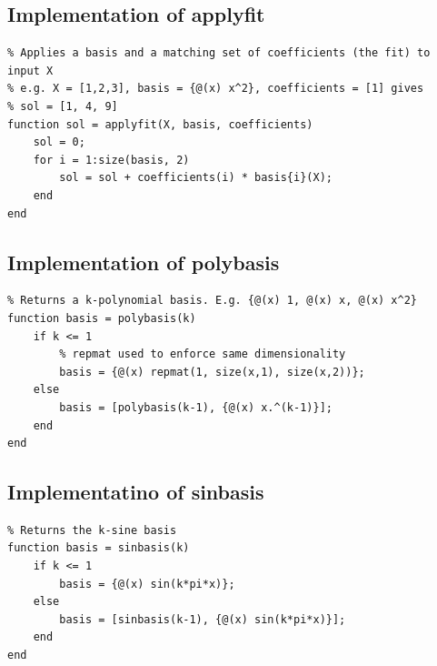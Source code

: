 \documentclass[11pt]{article}
\begin{document}
    \subsection{Implementation of applyfit}
        \begin{lstlisting}
% Applies a basis and a matching set of coefficients (the fit) to input X
% e.g. X = [1,2,3], basis = {@(x) x^2}, coefficients = [1] gives
% sol = [1, 4, 9] 
function sol = applyfit(X, basis, coefficients)
    sol = 0;
    for i = 1:size(basis, 2)
        sol = sol + coefficients(i) * basis{i}(X);
    end
end
        \end{lstlisting}
    
    \subsection{Implementation of polybasis}
        \begin{lstlisting}
% Returns a k-polynomial basis. E.g. {@(x) 1, @(x) x, @(x) x^2}
function basis = polybasis(k)
    if k <= 1
        % repmat used to enforce same dimensionality
        basis = {@(x) repmat(1, size(x,1), size(x,2))}; 
    else
        basis = [polybasis(k-1), {@(x) x.^(k-1)}];
    end
end
        \end{lstlisting}
    
    \subsection{Implementatino of sinbasis} \label{appendix:sinbasis}
        \begin{lstlisting}
% Returns the k-sine basis 
function basis = sinbasis(k)
    if k <= 1
        basis = {@(x) sin(k*pi*x)}; 
    else
        basis = [sinbasis(k-1), {@(x) sin(k*pi*x)}];
    end
end
        \end{lstlisting}
\end{document}
